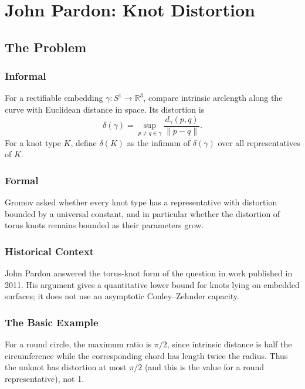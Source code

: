 
\chapter{John Pardon: Knot Distortion}

\section{The Problem}

\subsection{Informal}

For a rectifiable embedding $\gamma:S^1\to\mathbb{R}^3$, compare intrinsic arclength along the curve with Euclidean distance in space. Its distortion is
\[
\delta(\gamma)=\sup_{p\ne q\in\gamma}\frac{d_\gamma(p,q)}{\lVert p-q\rVert}.
\]
For a knot type $K$, define $\delta(K)$ as the infimum of $\delta(\gamma)$ over all representatives of $K$.

\subsection{Formal}

Gromov asked whether every knot type has a representative with distortion bounded by a universal constant, and in particular whether the distortion of torus knots remains bounded as their parameters grow.

\subsection{Historical Context}

John Pardon answered the torus-knot form of the question in work published in 2011. His argument gives a quantitative lower bound for knots lying on embedded surfaces; it does not use an asymptotic Conley--Zehnder capacity.

\subsection{The Basic Example}

For a round circle, the maximum ratio is $\pi/2$, since intrinsic distance is half the circumference while the corresponding chord has length twice the radius. Thus the unknot has distortion at most $\pi/2$ (and this is the value for a round representative), not 1.

